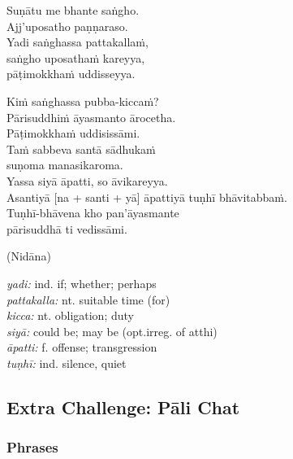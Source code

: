 \documentclass[11pt,oneside]{memoir}
\begin{document}
\begin{widecols}


Suṇātu me bhante saṅgho. \\
Ajj'uposatho paṇṇaraso. \\
Yadi saṅghassa pattakallaṁ, \\
saṅgho uposathaṁ kareyya, \\
pāṭimokkhaṁ uddisseyya.

Kiṁ saṅghassa pubba-kiccaṁ? \\
Pārisuddhiṁ āyasmanto ārocetha. \\
Pāṭimokkhaṁ uddisissāmi. \\
Taṁ sabbeva santā sādhukaṁ \\
suṇoma manasikaroma. \\
Yassa siyā āpatti, so āvikareyya. \\
Asantiyā [na + santi + yā] āpattiyā tuṇhī bhāvitabbaṁ. \\
Tuṇhī-bhāvena kho pan'āyasmante \\
pārisuddhā ti vedissāmi.

(Nidāna)

\columnbreak

\emph{yadi:} ind. if; whether; perhaps \\
\emph{pattakalla:} nt. suitable time (for) \\
\emph{kicca:} nt. obligation; duty \\
\emph{siyā:} could be; may be (opt.irreg. of atthi) \\
\emph{āpatti:} f. offense; transgression \\
\emph{tuṇhī:} ind. silence, quiet
\end{widecols}

\clearpage
\subsection{Extra Challenge: Pāli Chat}
\label{sec:orgf14e857}
\subsubsection{Phrases}
\label{sec:org5569a3c}
\end{document}
